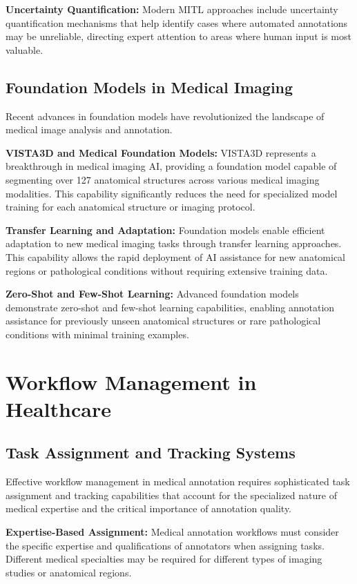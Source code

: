 \textbf{Uncertainty Quantification:} Modern MITL approaches include uncertainty quantification mechanisms that help identify cases where automated annotations may be unreliable, directing expert attention to areas where human input is most valuable.

\subsection{Foundation Models in Medical Imaging}

Recent advances in foundation models have revolutionized the landscape of medical image analysis and annotation.

\textbf{VISTA3D and Medical Foundation Models:} VISTA3D represents a breakthrough in medical imaging AI, providing a foundation model capable of segmenting over 127 anatomical structures across various medical imaging modalities. This capability significantly reduces the need for specialized model training for each anatomical structure or imaging protocol.

\textbf{Transfer Learning and Adaptation:} Foundation models enable efficient adaptation to new medical imaging tasks through transfer learning approaches. This capability allows the rapid deployment of AI assistance for new anatomical regions or pathological conditions without requiring extensive training data.

\textbf{Zero-Shot and Few-Shot Learning:} Advanced foundation models demonstrate zero-shot and few-shot learning capabilities, enabling annotation assistance for previously unseen anatomical structures or rare pathological conditions with minimal training examples.

\section{Workflow Management in Healthcare}

\subsection{Task Assignment and Tracking Systems}

Effective workflow management in medical annotation requires sophisticated task assignment and tracking capabilities that account for the specialized nature of medical expertise and the critical importance of annotation quality.

\textbf{Expertise-Based Assignment:} Medical annotation workflows must consider the specific expertise and qualifications of annotators when assigning tasks. Different medical specialties may be required for different types of imaging studies or anatomical regions.

